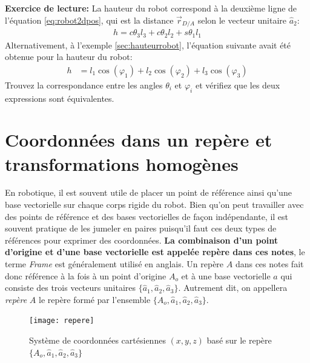 \textbf{Exercice de lecture: } La hauteur du robot correspond à la deuxième ligne de l'équation \eqref{eq:robot2dpos}, qui est la distance $\vec{r}_{D/A}$ selon le vecteur unitaire $\hat{a}_2$: 
\begin{align}
h = c\theta_3 l_3 + c\theta_2 l_2  + s\theta_1 l_1  
\end{align} 
Alternativement, à l'exemple \ref{sec:hauteurrobot}, l'équation suivante avait été obtenue pour la hauteur du robot:
\begin{align}
h &= l_1 \cos (\varphi_1) + l_2 \cos (\varphi_2) + l_3 \cos (\varphi_3)
\end{align} 
Trouvez la correspondance entre les angles $\theta_i$ et $\varphi_i$ et vérifiez que les deux expressions sont équivalentes.





\newpage
\section{Coordonnées dans un repère et transformations homogènes}
\label{sec:repere}

En robotique, il est souvent utile de placer un point de référence ainsi qu'une base vectorielle sur chaque corps rigide du robot. Bien qu'on peut travailler avec des points de référence et des bases vectorielles de façon indépendante, il est souvent pratique de les jumeler en paires puisqu'il faut ces deux types de références pour exprimer des coordonnées. \textbf{La combinaison d'un point d'origine et d'une base vectorielle est appelée repère dans ces notes}, le terme \textit{Frame} est généralement utilisé en anglais. Un repère $A$ dans ces notes fait donc référence à la fois à un point d'origine $A_o$ et à une base vectorielle $a$ qui consiste des trois vecteurs unitaires $\{ \hat{a}_1, \hat{a}_2, \hat{a}_3 \}$. Autrement dit, on appellera \textit{repère} $A$ le repère formé par l'ensemble $\{ A_o, \hat{a}_1, \hat{a}_2, \hat{a}_3 \}$. 
\begin{figure}[htpb]
	\centering
		\texttt{[image: repere]}
	\caption{Système de coordonnées cartésiennes $(x,y,z)$ basé sur le repère $\{A_o,\hat{a}_1,\hat{a}_2,\hat{a}_3\}$}
	\label{fig:repere}
\end{figure}

